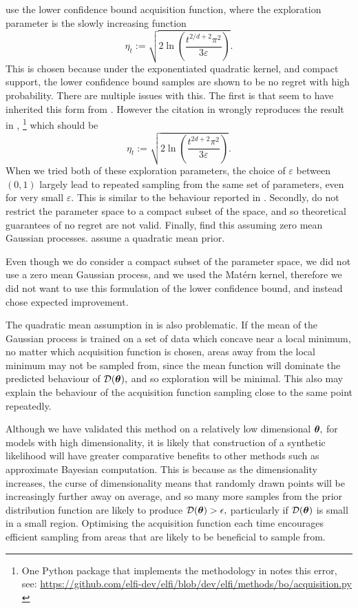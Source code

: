 \cite{gutmann_bayesian_2016} use the lower confidence bound acquisition
function, where the
exploration parameter is the slowly increasing function
$$\eta_t:= \sqrt{2\ln\left(\frac{t^{2/d + 2}\pi^2}{3\varepsilon}\right)}.$$
This is chosen because under the exponentiated quadratic kernel, and compact
support, the lower confidence bound samples are shown to be no regret with high
probability. There are multiple issues with this. The first is that
 seem to have inherited this form from
\cite{brochu_tutorial_2010}. However the citation in
\cite{brochu_tutorial_2010} wrongly reproduces the result in
\cite{srinivas_gaussian_2010},
\footnote{
    One Python package that implements the methodology in
    \cite{gutmann_bayesian_2016} notes this error, see:
    \url{
        https://github.com/elfi-dev/elfi/blob/dev/elfi/methods/bo/acquisition.py
    }
} which should be
$$\eta_t:= \sqrt{2\ln\left(\frac{t^{2d + 2}\pi^2}{3\varepsilon}\right)}.$$
When we tried both of these exploration parameters, the choice of
$\varepsilon$ between $(0, 1)$ largely lead to repeated sampling from the same
set of parameters, even for very small $\varepsilon.$ This is similar to the
behaviour reported in \cite{gutmann_bayesian_2016}. Secondly,
 do not restrict the parameter space to
a compact subset of the space, and so theoretical guarantees of no regret are
not valid. Finally,  find this assuming
zero mean Gaussian processes.  assume
a quadratic mean prior.

Even though we do consider a compact subset of the parameter space,
we did not use a zero mean Gaussian process, and we used the Mat\'ern kernel,
therefore we did not want to use this formulation of the lower confidence bound,
and instead chose expected improvement.

The quadratic mean assumption in \cite{gutmann_bayesian_2016} is also
problematic. If the mean of the Gaussian process
is trained on a set of data which concave near a local
minimum, no matter which acquisition function is chosen, areas away from the
local minimum may not be sampled from, since the mean function will dominate
the predicted behaviour of $\mathcal{D}(\bm{\theta}),$ and so exploration will be minimal.
This also may explain the behaviour of the acquisition function sampling close
to the same point repeatedly.

Although we have validated this method on a relatively low dimensional
$\bm{\theta},$ for models with high dimensionality, it is likely that construction
of a synthetic likelihood will have greater comparative benefits
to other methods such as approximate Bayesian computation.
This is because as the dimensionality increases, the curse of dimensionality
means that randomly drawn points will be increasingly further away on average,
and so many more samples from the prior distribution function are likely to
produce $\mathcal{D}(\bm{\theta}) > \epsilon,$ particularly if $\mathcal{D}(\bm{\theta})$ is small in
a small region. Optimising the acquisition function each time encourages
efficient sampling from areas that are likely to be beneficial to sample from.

